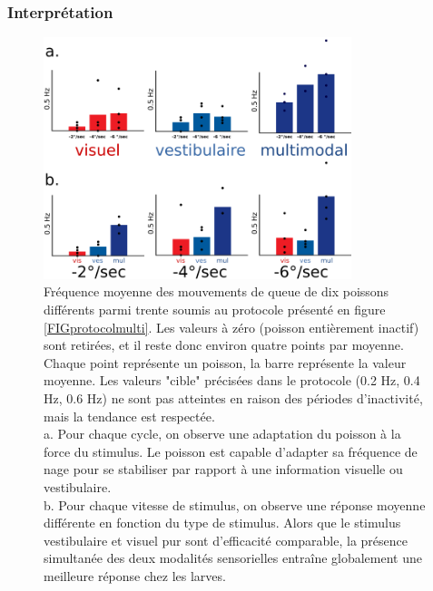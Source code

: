
\subsubsection{Interprétation}

\begin{figure}
    \centering
    \includegraphics[width=0.8\textwidth]{./files/stats.svg.png}
    \caption{
    Fréquence moyenne des mouvements de queue de dix poissons différents parmi trente soumis au protocole présenté en figure \ref{FIGprotocolmulti}. Les valeurs à zéro (poisson entièrement inactif) sont retirées, et il reste donc environ quatre points par moyenne. Chaque point représente un poisson, la barre représente la valeur moyenne. Les valeurs "cible" précisées dans le protocole (0.2 Hz, 0.4 Hz, 0.6 Hz) ne sont pas atteintes en raison des périodes d'inactivité, mais la tendance est respectée.
    \\ a. Pour chaque cycle, on observe une adaptation du poisson à la force du stimulus. Le poisson est capable d'adapter sa fréquence de nage pour se stabiliser par rapport à une information visuelle ou vestibulaire.
    \\ b. Pour chaque vitesse de stimulus, on observe une réponse moyenne différente en fonction du type de stimulus. Alors que le stimulus vestibulaire et visuel pur sont d'efficacité comparable, la présence simultanée des deux modalités sensorielles entraîne globalement une meilleure réponse chez les larves.}
    \end{figure}

